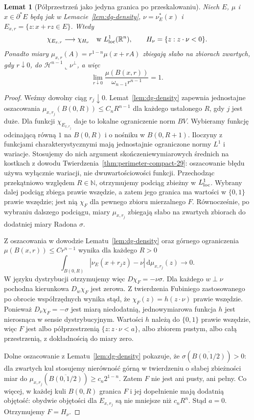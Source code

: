 \documentclass[11pt,a4paper,oneside]{book}
\numberwithin{equation}{chapter}
\theoremstyle{plain}
\newtheorem{lemat}[twierdzenie]{Lemat}
\theoremstyle{definition}
\theoremstyle{remark}
\begin{document}
\begin{lemat}[Półprzestrzeń jako jedyna granica po przeskalowaniu]
\label{lem:dg-blowup}
Niech $E$, $\mu$ i $x\in\partial^*E$ będą jak
w Lemacie~\ref{lem:dg-density}, $\nu=\nu_E^*(x)$
i $E_{x,r}=\{z:x+rz\in E\}$. Wtedy
\[
 \chi_{E_{x,r}}\longrightarrow\chi_{H_\nu}
 \quad\text{w }L^1_{\rm loc}(\mathbb R^n),\qquad
 H_\nu=\{z:z\cdot\nu<0\}.
\]
Ponadto miary $\mu_{x,r}(A)=r^{1-n}\mu(x+rA)$
zbiegają słabo na zbiorach zwartych, gdy
$r\downarrow0$, do
$\mathcal H^{n-1}\llcorner\nu^\perp$, a więc
\[
 \lim_{r\downarrow0}
 \frac{\mu(B(x,r))}{\omega_{n-1}r^{n-1}}=1.
\]
\end{lemat}
\begin{proof}
Weźmy dowolny ciąg $r_j\downarrow0$.
Lemat~\ref{lem:dg-density} zapewnia jednostajne
oszacowania $\mu_{x,r_j}(B(0,R))\le C_nR^{n-1}$
dla każdego ustalonego $R$, gdy $j$ jest duże.
Dla funkcji $\chi_{E_{x,r_j}}$ daje to lokalne
ograniczenie norm $BV$. Wybieramy funkcję
odcinającą równą $1$ na $B(0,R)$ i o nośniku
w $B(0,R+1)$. Iloczyny z funkcjami
charakterystycznymi mają jednostajnie
ograniczone normy $L^1$ i wariacje.
Stosujemy do nich argument skończeniewymiarowych
średnich na kostkach z dowodu
Twierdzenia~\ref{thm:perimeter-compact-29}:
oszacowanie błędu używa wyłącznie wariacji,
nie dwuwartościowości funkcji. Przechodząc
przekątniowo względem $R\in\mathbb N$,
otrzymujemy podciąg zbieżny w $L^1_{\rm loc}$.
Wybrany dalej podciąg zbiega prawie wszędzie,
a zatem jego granica ma wartości w $\{0,1\}$
prawie wszędzie; jest nią $\chi_F$ dla pewnego
zbioru mierzalnego $F$.
Równocześnie, po wybraniu dalszego podciągu,
miary $\mu_{x,r_j}$ zbiegają słabo na zwartych
zbiorach do dodatniej miary Radona $\sigma$.

Z oszacowania w dowodzie Lematu~\ref{lem:dg-density}
oraz górnego ograniczenia $\mu(B(x,r))\le Cr^{n-1}$
wynika dla każdego $R>0$
\[
 \int_{B(0,R)}|\nu_E(x+r_jz)-\nu|\,
 \mathrm d\mu_{x,r_j}(z)\longrightarrow0.
\]
W języku dystrybucji otrzymujemy więc
$D\chi_F=-\nu\sigma$. Dla każdego $w\perp\nu$
pochodna kierunkowa $D_w\chi_F$ jest zerowa.
Z twierdzenia Fubiniego zastosowanego po obrocie
współrzędnych wynika stąd, że
$\chi_F(z)=h(z\cdot\nu)$ prawie wszędzie.
Ponieważ $D_\nu\chi_F=-\sigma$ jest miarą
niedodatnią, jednowymiarowa funkcja $h$ jest
nierosnąca w sensie dystrybucyjnym.
Wartości $h$ należą do $\{0,1\}$ prawie wszędzie,
więc $F$ jest albo półprzestrzenią
$\{z:z\cdot\nu<a\}$, albo zbiorem pustym,
albo całą przestrzenią, z dokładnością do miary zero.

Dolne oszacowanie z Lematu~\ref{lem:dg-density}
pokazuje, że $\sigma(\overline{B(0,1/2)})>0$:
dla zwartych kul stosujemy nierówność górną
w twierdzeniu o słabej zbieżności miar do
$\mu_{x,r_j}(\overline{B(0,1/2)})\ge c_n2^{1-n}$.
Zatem $F$ nie jest ani pusty, ani pełny.
Co więcej, w każdej kuli $B(0,R)$ granica $F$
i jej dopełnienie mają dodatnią objętość:
obydwie objętości dla $E_{x,r_j}$ są
nie mniejsze niż $c_nR^n$. Stąd $a=0$.
Otrzymujemy $F=H_\nu$.


\end{proof}
\end{document}
